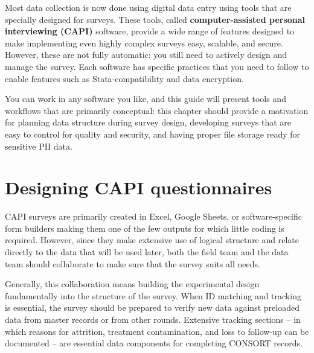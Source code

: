 
\begin{fullwidth}
Most data collection is now done using digital data entry
using tools that are specially designed for surveys.
These tools, called \textbf{computer-assisted personal interviewing (CAPI)} software,
provide a wide range of features designed to make
implementing even highly complex surveys easy, scalable, and secure.
However, these are not fully automatic:
you still need to actively design and manage the survey.
Each software has specific practices that you need to follow
to enable features such as Stata-compatibility and data encryption.

You can work in any software you like,
and this guide will present tools and workflows
that are primarily conceptual:
this chapter should provide a motivation for
planning data structure during survey design,
developing surveys that are easy to control for quality and security,
and having proper file storage ready for sensitive PII data.
\end{fullwidth}


\section{Designing CAPI questionnaires}

CAPI surveys
are primarily created in Excel, Google Sheets,
or software-specific form builders
making them one of the few outputs for which little coding is required.
However, since they make extensive use of logical structure and
relate directly to the data that will be used later,
both the field team and the data team should
collaborate to make sure that the survey suits all needs.\cite{krosnick2018questionnaire}

Generally, this collaboration means building the experimental design
fundamentally into the structure of the survey.
When ID matching and tracking is essential,
the survey should be prepared to verify new data
against preloaded data from master records or from other rounds.
Extensive tracking sections --
in which reasons for attrition, treatment contamination, and
loss to follow-up can be documented --
are essential data components for completing CONSORT records.\cite{begg1996improving}

